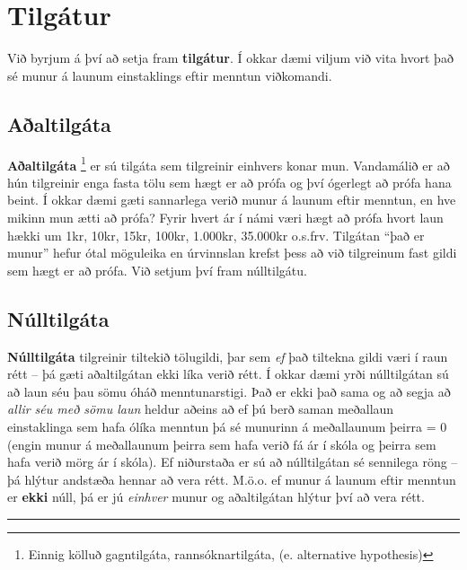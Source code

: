 \documentclass[
]{book}
\begin{document}
\hypertarget{cross}{%
\section{Tilgátur}\label{cross}}

Við byrjum á því að setja fram \textbf{tilgátur}. Í okkar dæmi viljum við
vita hvort það sé munur á launum einstaklings eftir menntun viðkomandi.

\hypertarget{auxf0altilguxe1ta}{%
\subsection{Aðaltilgáta}\label{auxf0altilguxe1ta}}

\textbf{Aðaltilgáta} \footnote{Einnig kölluð gagntilgáta, rannsóknartilgáta, (e.
  alternative hypothesis)} er sú tilgáta sem tilgreinir
einhvers konar mun. Vandamálið er að hún tilgreinir enga fasta tölu sem
hægt er að prófa og því ógerlegt að prófa hana beint. Í okkar dæmi gæti
sannarlega verið munur á launum eftir menntun, en hve mikinn mun ætti að
prófa? Fyrir hvert ár í námi væri hægt að prófa hvort laun hækki um 1kr,
10kr, 15kr, 100kr, 1.000kr, 35.000kr o.s.frv. Tilgátan ``það er munur''
hefur ótal möguleika en úrvinnslan krefst þess að við tilgreinum fast
gildi sem hægt er að prófa. Við setjum því fram núlltilgátu.

\hypertarget{nuxfalltilguxe1ta}{%
\subsection{Núlltilgáta}\label{nuxfalltilguxe1ta}}

\textbf{Núlltilgáta} tilgreinir tiltekið tölugildi, þar sem \emph{ef} það tiltekna
gildi væri í raun rétt -- þá gæti aðaltilgátan ekki líka verið rétt. Í
okkar dæmi yrði núlltilgátan sú að laun séu þau sömu óháð
menntunarstigi. Það er ekki það sama og að segja að \emph{allir séu með sömu
laun} heldur aðeins að ef þú berð saman meðallaun einstaklinga sem hafa
ólíka menntun þá sé munurinn á meðallaunum þeirra = 0 (engin munur á
meðallaunum þeirra sem hafa verið fá ár í skóla og þeirra sem hafa verið
mörg ár í skóla). Ef niðurstaða er sú að núlltilgátan sé sennilega röng
-- þá hlýtur andstæða hennar að vera rétt. M.ö.o. ef munur á launum
eftir menntun er \textbf{ekki} núll, þá er jú \emph{einhver} munur og aðaltilgátan
hlýtur því að vera rétt.

\begin{center}\rule{0.5\linewidth}{0.5pt}\end{center}
\end{document}

